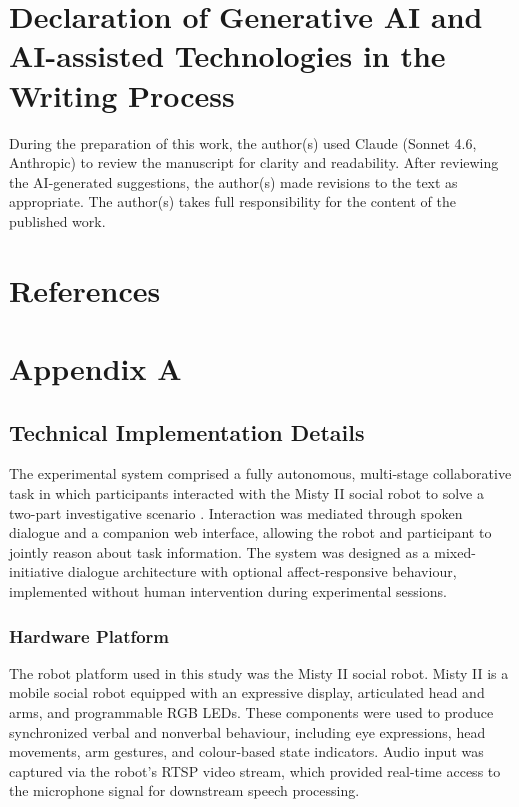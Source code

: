 \documentclass[
  authoryear,
  doubleblind,
  3p]{elsarticle}
\begin{document}
\section{Declaration of Generative AI and AI-assisted Technologies in
the Writing
Process}\label{declaration-of-generative-ai-and-ai-assisted-technologies-in-the-writing-process}

During the preparation of this work, the author(s) used Claude (Sonnet
4.6, Anthropic) to review the manuscript for clarity and readability.
After reviewing the AI-generated suggestions, the author(s) made
revisions to the text as appropriate. The author(s) takes full
responsibility for the content of the published work.

\section{References}\label{references}

\protect{}\label{sec-refs}

\section{Appendix A}\label{sec-appendix-a}

\subsection{Technical Implementation
Details}\label{technical-implementation-details}

The experimental system comprised a fully autonomous, multi-stage
collaborative task in which participants interacted with the Misty II
social robot to solve a two-part investigative scenario
\citep{mistyrobotics}. Interaction was mediated through spoken dialogue
and a companion web interface, allowing the robot and participant to
jointly reason about task information. The system was designed as a
mixed-initiative dialogue architecture with optional affect-responsive
behaviour, implemented without human intervention during experimental
sessions.

\subsubsection{Hardware Platform}\label{hardware-platform}

The robot platform used in this study was the Misty II social robot.
Misty II is a mobile social robot equipped with an expressive display,
articulated head and arms, and programmable RGB LEDs. These components
were used to produce synchronized verbal and nonverbal behaviour,
including eye expressions, head movements, arm gestures, and
colour-based state indicators. Audio input was captured via the robot's
RTSP video stream, which provided real-time access to the microphone
signal for downstream speech processing.
\end{document}
